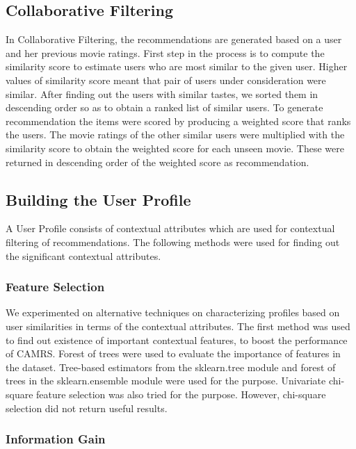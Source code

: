 \documentclass{article}
\begin{document}
\subsection{Collaborative Filtering}
In Collaborative Filtering, the recommendations are generated based on a user and her previous movie ratings. First step in the process is to compute the similarity score to estimate users who are most similar to the given user. Higher values of similarity score meant that pair of users under consideration were similar. After finding out the users with similar tastes, we sorted them in descending order so as to obtain a ranked list of similar users. To generate recommendation the items were scored by producing a weighted score that
ranks the users. The movie ratings of the other similar users were multiplied with the similarity score to obtain the weighted score for each unseen movie. These were returned in descending order of the weighted score as recommendation. \cite{segaran2008programming}  

\subsection{Building the User Profile}

A User Profile consists of contextual attributes which are used for contextual filtering of recommendations. The following methods were used for finding out the significant contextual attributes.

\subsubsection{Feature Selection}

We experimented on alternative techniques on characterizing profiles based on user similarities in terms of the contextual attributes. The first method was used to find out existence of important contextual features, to boost the performance of CAMRS. Forest of trees were used to evaluate the importance of features in the dataset. Tree-based estimators from the sklearn.tree module and forest of trees in the sklearn.ensemble module were used for the purpose. Univariate chi-square feature selection was also tried for the purpose. However, chi-square selection did not return useful results.

\subsubsection{Information Gain}
\end{document}
